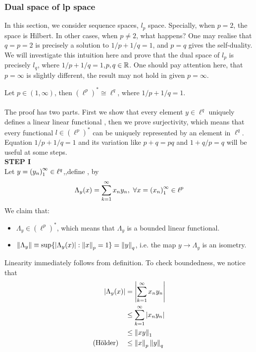 \subsubsection{Dual space of lp space}\label{lp dual}
In this section, we consider sequence spaces, $l_p$ space. Specially, when $p=2$, the space is Hilbert. In other cases,  when $p\not=2$, what happens? One may realise that $q=p=2$ is precisely a solution to $1/p+1/q=1$, and $p=q$ gives the self-duality. We will investigate this intuition here and prove that the dual space of $l_p$ is precisely $l_q$, where $1/p+1/q=1$,$p,q\in\mathbb{R}$. One should pay attention here, that $p=\infty$ is slightly different, the result may not hold in given $p=\infty$.

\begin{theorem}\rm\nextline
	Let $p\in (1,\infty)$, then $(\ell^p)^*\cong\ell^q $, where $1/p+1/q=1$.\\
	\prf\\
	The proof has two parts. First we show that every element  $y\in\ell^q$ uniquely defines a linear linear functional , then we prove surjectivity, which means that every functional $l\in(\ell^p)^*$ can be uniquely represented by an element in $\ell^q$. Equation $1/p+1/q=1$ and its variation like $p+q=pq$ and  $1+q/p=q$ will be useful at some steps.\\
	{\bf{STEP I}}\\
	Let $y=\left({y_n}\right)_1^\infty\in\ell^q$,,define , by 
	$$\Lambda_y(x)=\sum_{k=1}^{\infty}x_ny_n,\,\,\forall x=\left({x_n}\right)_1^\infty\in\ell^p$$
	We claim that:\begin{itemize}
		\item $\Lambda_y\in(\ell^p)^*$, which means that $\Lambda_y$ is a bounded linear functional.
		\item $\left\|{\Lambda_y}\right\|\equiv\sup\{|\Lambda_y(x)|:\left\|{x}\right\|_p=1\}=\left\|{y}\right\|_q$, i.e. the map $y\rightarrow\Lambda_y$ is an isometry.
	\end{itemize}
	Linearity immediately follows from definition. To check boundedness, we notice that
	\begin{equation}
		\begin{split}
		\left|\Lambda_y(x)\right|&=\left|\sum_{k=1}^{\infty}x_ny_n\right|\\
		&\leq\sum_{k=1}^{\infty}|x_ny_n|\\
		&\leq\norm{xy}_1\\
		\text{(Hölder)}\quad&\leq\norm{x}_p\norm{y}_q
		\end{split}

\end{equation}
\end{theorem}
